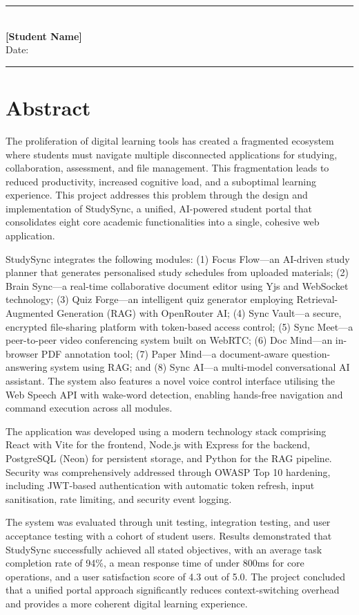 \documentclass[12pt,a4paper]{report}
\begin{document}
\vspace{2cm}
\noindent\rule{6cm}{0.4pt}\\
\textbf{[Student Name]}\\
Date: \rule{4cm}{0.4pt}

\newpage
\chapter*{Abstract}

The proliferation of digital learning tools has created a fragmented ecosystem where students must navigate multiple disconnected applications for studying, collaboration, assessment, and file management. This fragmentation leads to reduced productivity, increased cognitive load, and a suboptimal learning experience. This project addresses this problem through the design and implementation of StudySync, a unified, AI-powered student portal that consolidates eight core academic functionalities into a single, cohesive web application.

StudySync integrates the following modules: (1) Focus Flow---an AI-driven study planner that generates personalised study schedules from uploaded materials; (2) Brain Sync---a real-time collaborative document editor using Yjs and WebSocket technology; (3) Quiz Forge---an intelligent quiz generator employing Retrieval-Augmented Generation (RAG) with OpenRouter AI; (4) Sync Vault---a secure, encrypted file-sharing platform with token-based access control; (5) Sync Meet---a peer-to-peer video conferencing system built on WebRTC; (6) Doc Mind---an in-browser PDF annotation tool; (7) Paper Mind---a document-aware question-answering system using RAG; and (8) Sync AI---a multi-model conversational AI assistant. The system also features a novel voice control interface utilising the Web Speech API with wake-word detection, enabling hands-free navigation and command execution across all modules.

The application was developed using a modern technology stack comprising React with Vite for the frontend, Node.js with Express for the backend, PostgreSQL (Neon) for persistent storage, and Python for the RAG pipeline. Security was comprehensively addressed through OWASP Top 10 hardening, including JWT-based authentication with automatic token refresh, input sanitisation, rate limiting, and security event logging.

The system was evaluated through unit testing, integration testing, and user acceptance testing with a cohort of student users. Results demonstrated that StudySync successfully achieved all stated objectives, with an average task completion rate of 94\%, a mean response time of under 800ms for core operations, and a user satisfaction score of 4.3 out of 5.0. The project concluded that a unified portal approach significantly reduces context-switching overhead and provides a more coherent digital learning experience.
\end{document}
